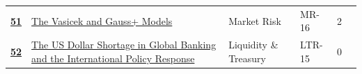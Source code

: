 \begin{longtable}{@{}r@{\hskip 7pt}L{6.35cm}@{\hskip 5pt}l@{\hskip 10pt}l@{\hskip 3pt}r@{\hskip 7pt}r@{}}
\hyperref[roi:51]{{\sffamily\bfseries\color{FRMGold}51}} & \hyperref[roi:51]{{\color{black}The Vasicek and Gauss+ Models}} & {\color{FRMGrey}Market Risk} & {\color{FRMGrey}MR-16} & {\color{FRMGrey}2} & \hyperref[roi:51]{{\sffamily\bfseries\color{FRMNavy}\pageref{roi:51}}} \\
\hyperref[roi:52]{{\sffamily\bfseries\color{FRMGold}52}} & \hyperref[roi:52]{{\color{black}The US Dollar Shortage in Global Banking and the International Policy Response}} & {\color{FRMGrey}Liquidity \& Treasury} & {\color{FRMGrey}LTR-15} & {\color{FRMGrey}0} & \hyperref[roi:52]{{\sffamily\bfseries\color{FRMNavy}\pageref{roi:52}}} \\
\end{longtable}
